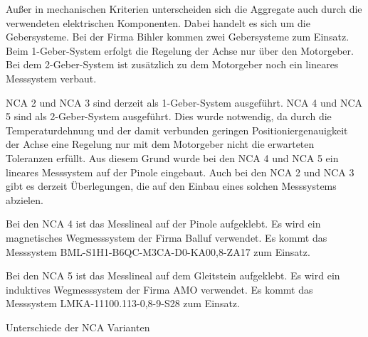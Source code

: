 Außer in mechanischen Kriterien unterscheiden sich die Aggregate auch durch die verwendeten elektrischen Komponenten. Dabei handelt es sich um die Gebersysteme. Bei der Firma Bihler kommen zwei Gebersysteme zum Einsatz. Beim 1-Geber-System erfolgt die Regelung der Achse nur über den Motorgeber. Bei dem 2-Geber-System ist zusätzlich zu dem Motorgeber noch ein lineares Messsystem verbaut.

NCA 2 und NCA 3 sind derzeit als 1-Geber-System ausgeführt. NCA 4 und NCA 5 sind als 2-Geber-System ausgeführt. Dies wurde notwendig, da durch die Temperaturdehnung und der damit verbunden geringen Positioniergenauigkeit der Achse eine Regelung nur mit dem Motorgeber nicht die erwarteten Toleranzen erfüllt. Aus diesem Grund wurde bei den NCA 4 und NCA 5 ein lineares Messsystem auf der Pinole eingebaut. Auch bei den NCA 2 und NCA 3 gibt es derzeit Überlegungen, die auf den Einbau eines solchen Messsystems abzielen.

Bei den NCA 4 ist das Messlineal auf der Pinole aufgeklebt. Es wird ein magnetisches Wegmesssystem der Firma Balluf verwendet. Es kommt das Messsystem BML-S1H1-B6QC-M3CA-D0-KA00,8-ZA17 zum Einsatz.

Bei den NCA 5 ist das Messlineal auf dem Gleitstein aufgeklebt. Es wird ein induktives Wegmesssystem der Firma AMO verwendet. Es kommt das Messsystem  LMKA-11100.113-0,8-9-S28 zum Einsatz.


\begin{table}[H]
\center
{}
\caption{Unterschiede der NCA Varianten}
\label{fig:Unterschiede_der_NCA_Varianten}
\end{table}




